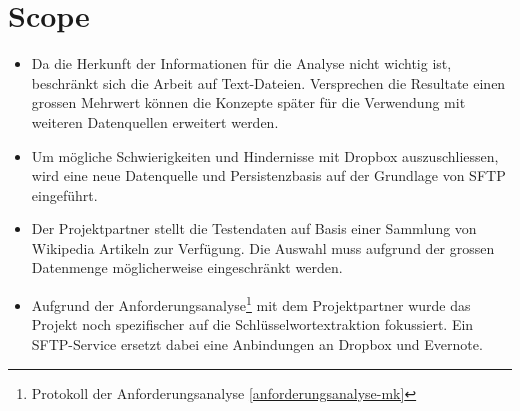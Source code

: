 \section{Scope}\label{sec:scope} 

\begin{itemize}
    \item Da die Herkunft der Informationen für die Analyse nicht wichtig ist, beschränkt sich die Arbeit auf Text-Dateien. Versprechen die Resultate einen grossen Mehrwert können die Konzepte spä\-ter für die Verwendung mit weiteren Datenquellen erweitert werden.
    \item Um mögliche Schwierigkeiten und Hindernisse mit Dropbox auszuschliessen, wird eine neue Datenquelle und Persistenzbasis auf der Grundlage von \gls{SFTP} eingeführt.
    \item Der Projektpartner stellt die Testendaten auf Basis einer Sammlung von Wikipedia Artikeln zur Verfügung. Die Auswahl muss aufgrund der grossen Datenmenge möglicherweise eingeschränkt werden.
    \item Aufgrund der Anforderungsanalyse\footnote{{Protokoll der Anforderungsanalyse \autoref{anforderungsanalyse-mk}}} mit dem Projektpartner wurde das Projekt noch spezifischer auf die Schlüss\-el\-wort\-ex\-traktion fokussiert. Ein SFTP-Service ersetzt dabei eine Anbindungen an Dropbox und Evernote.
\end{itemize}

